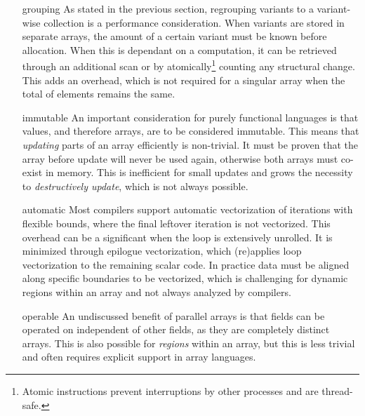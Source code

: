 \documentclass{article}
\begin{document}
\begin{itemize}
    \item [grouping]
    As stated in the previous section, regrouping variants to a variant-wise collection is a performance consideration.
    When variants are stored in separate arrays, the amount of a certain variant must be known before allocation.
    When this is dependant on a computation, it can be retrieved through an additional scan or by atomically\footnote{Atomic instructions prevent interruptions by other processes and are thread-safe.} counting any structural change.
    This adds an overhead, which is not required for a singular array when the total of elements remains the same.

    \item [immutable]
    An important consideration for purely functional languages is that values, and therefore arrays, are to be considered immutable.
    This means that {\it{updating}} parts of an array efficiently is non-trivial.
    It must be proven that the array before update will never be used again, otherwise both arrays must co-exist in memory.
    This is inefficient for small updates and grows the necessity to {\it destructively update}\cite{destructive-update-array}, which is not always possible.

    \item[automatic]
    Most compilers support automatic vectorization of iterations with flexible bounds, where the final leftover iteration is not vectorized.  
    This overhead can be a significant when the loop is extensively unrolled.
    It is minimized through epilogue vectorization, which (re)applies loop vectorization to the remaining scalar code.
    In practice data must be aligned along specific boundaries to be vectorized, which is challenging for dynamic regions within an array and not always analyzed by compilers\cite{automatic-vectorization}.

    \item [operable]
    An undiscussed benefit of parallel arrays is that fields can be operated on independent of other fields, as they are completely distinct arrays.
    This is also possible for {\it regions} within an array, but this is less trivial and often requires explicit support in array languages\cite{accelerate-independent-regions}. 
\end{itemize}
\end{document}
